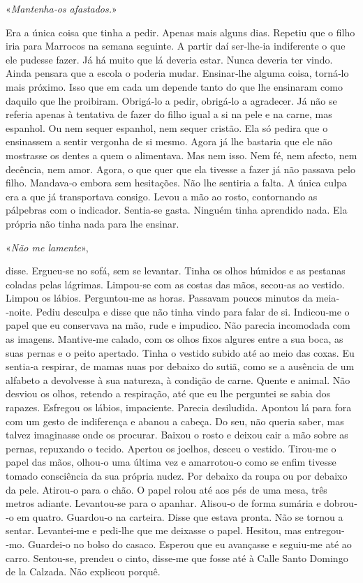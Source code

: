 «\emph{Mantenha­‑os afastados.}»

Era a única coisa que tinha a pedir. Apenas mais alguns dias. Repetiu
que o filho iria para Marrocos na semana seguinte. A partir daí
ser­‑lhe­‑ia indiferente o que ele pudesse fazer. Já há muito que lá
deveria estar. Nunca deveria ter vindo. Ainda pensara que a escola o
poderia mudar. Ensinar­‑lhe alguma coisa, torná­‑lo mais próximo. Isso
que em cada um depende tanto do que lhe ensinaram como daquilo que lhe
proibiram. Obrigá­‑lo a pedir, obrigá­‑lo a agradecer. Já não se referia
apenas à tentativa de fazer do filho igual a si na pele e na carne, mas
espanhol. Ou nem sequer espanhol, nem sequer cristão. Ela só pedira que
o ensinassem a sentir vergonha de si mesmo. Agora já lhe bastaria que
ele não mostrasse os dentes a quem o alimentava. Mas nem isso. Nem fé,
nem afecto, nem decência, nem amor. Agora, o que quer que ela tivesse a
fazer já não passava pelo filho. Mandava­‑o embora sem hesitações. Não
lhe sentiria a falta. A única culpa era a que já transportava consigo.
Levou a mão ao rosto, contornando as pálpebras com o indicador.
Sentia­‑se gasta. Ninguém tinha aprendido nada. Ela própria não tinha
nada para lhe ensinar.

«\emph{Não me lamente}»,

disse. Ergueu­‑se no sofá, sem se levantar. Tinha os olhos húmidos e as
pestanas coladas pelas lágrimas. Limpou­‑se com as costas das mãos,
secou­‑as ao vestido. Limpou os lábios. Perguntou­‑me as horas. Passavam
poucos minutos da meia­‑noite. Pediu desculpa e disse que não tinha
vindo para falar de si. Indicou­‑me o papel que eu conservava na mão,
rude e impudico. Não parecia incomodada com as imagens. Mantive­‑me
calado, com os olhos fixos algures entre a sua boca, as suas pernas e o
peito apertado. Tinha o vestido subido até ao meio das coxas. Eu
sentia­‑a respirar, de mamas nuas por debaixo do sutiã, como se a
ausência de um alfabeto a devolvesse à sua natureza, à condição de
carne. Quente e animal. Não desviou os olhos, retendo a respiração, até
que eu lhe perguntei se sabia dos rapazes. Esfregou os lábios,
impaciente. Parecia desiludida. Apontou lá para fora com um gesto de
indiferença e abanou a cabeça. Do seu, não queria saber, mas talvez
imaginasse onde os procurar. Baixou o rosto e deixou cair a mão sobre as
pernas, repuxando o tecido. Apertou os joelhos, desceu o vestido.
Tirou­‑me o papel das mãos, olhou­‑o uma última vez e amarrotou­‑o como
se enfim tivesse tomado consciência da sua própria nudez. Por debaixo da
roupa ou por debaixo da pele. Atirou­‑o para o chão. O papel rolou até
aos pés de uma mesa, três metros adiante. Levantou­‑se para o apanhar.
Alisou­‑o de forma sumária e dobrou­‑o em quatro. Guardou­‑o na
carteira. Disse que estava pronta. Não se tornou a sentar. Levantei­‑me
e pedi­‑lhe que me deixasse o papel. Hesitou, mas entregou­‑mo.
Guardei­‑o no bolso do casaco. Esperou que eu avançasse e seguiu­‑me até
ao carro. Sentou­‑se, prendeu o cinto, disse­‑me que fosse até à Calle
Santo Domingo de la Calzada. Não explicou porquê.

